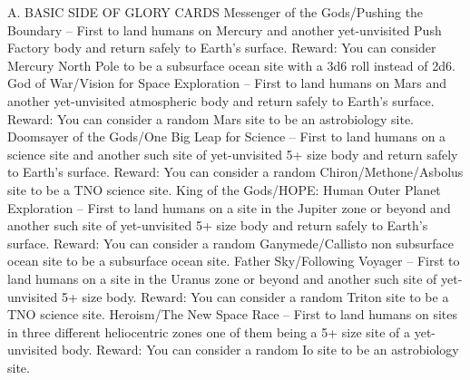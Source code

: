\documentclass[a4paper]{book}
\begin{document}
A. BASIC SIDE OF GLORY CARDS
Messenger of the Gods/Pushing the Boundary – First to land humans on Mercury and another yet-unvisited Push Factory body and return safely to Earth’s surface.
Reward: You can consider Mercury North Pole to be a subsurface ocean site with a 3d6 roll instead of 2d6.
God of War/Vision for Space Exploration – First to land humans on Mars and another yet-unvisited atmospheric body and return safely to Earth’s surface.
Reward: You can consider a random Mars site to be an astrobiology site.
Doomsayer of the Gods/One Big Leap for Science – First to land humans on a science site and another such site of yet-unvisited 5+ size body and return safely to Earth’s surface.
Reward: You can consider a random Chiron/Methone/Asbolus site to be a TNO science site.
King of the Gods/HOPE: Human Outer Planet Exploration – First to land humans on a site in the Jupiter zone or beyond and another such site of yet-unvisited 5+ size body and return safely to Earth’s surface.
Reward: You can consider a random Ganymede/Callisto non subsurface ocean site to be a subsurface ocean site.
Father Sky/Following Voyager – First to land humans on a site in the Uranus zone or beyond and another such site of yet-unvisited 5+ size body.
Reward: You can consider a random Triton site to be a TNO science site.
Heroism/The New Space Race – First to land humans on sites in three different heliocentric zones one of them being a 5+ size site of a yet-unvisited body.
Reward: You can consider a random Io site to be an astrobiology site.
\end{document}
